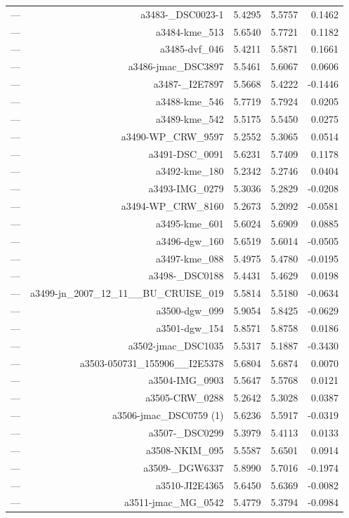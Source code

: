 \begin{table}[htbp]
\begin{tabular}{lrrrr}
— & a3483-_DSC0023-1 & 5.4295 & 5.5757 & 0.1462 \\
— & a3484-kme_513 & 5.6540 & 5.7721 & 0.1182 \\
— & a3485-dvf_046 & 5.4211 & 5.5871 & 0.1661 \\
— & a3486-jmac_DSC3897 & 5.5461 & 5.6067 & 0.0606 \\
— & a3487-_I2E7897 & 5.5668 & 5.4222 & -0.1446 \\
— & a3488-kme_546 & 5.7719 & 5.7924 & 0.0205 \\
— & a3489-kme_542 & 5.5175 & 5.5450 & 0.0275 \\
— & a3490-WP_CRW_9597 & 5.2552 & 5.3065 & 0.0514 \\
— & a3491-DSC_0091 & 5.6231 & 5.7409 & 0.1178 \\
— & a3492-kme_180 & 5.2342 & 5.2746 & 0.0404 \\
— & a3493-IMG_0279 & 5.3036 & 5.2829 & -0.0208 \\
— & a3494-WP_CRW_8160 & 5.2673 & 5.2092 & -0.0581 \\
— & a3495-kme_601 & 5.6024 & 5.6909 & 0.0885 \\
— & a3496-dgw_160 & 5.6519 & 5.6014 & -0.0505 \\
— & a3497-kme_088 & 5.4975 & 5.4780 & -0.0195 \\
— & a3498-_DSC0188 & 5.4431 & 5.4629 & 0.0198 \\
— & a3499-jn_2007_12_11__BU_CRUISE_019 & 5.5814 & 5.5180 & -0.0634 \\
— & a3500-dgw_099 & 5.9054 & 5.8425 & -0.0629 \\
— & a3501-dgw_154 & 5.8571 & 5.8758 & 0.0186 \\
— & a3502-jmac_DSC1035 & 5.5317 & 5.1887 & -0.3430 \\
— & a3503-050731_155906__I2E5378 & 5.6804 & 5.6874 & 0.0070 \\
— & a3504-IMG_0903 & 5.5647 & 5.5768 & 0.0121 \\
— & a3505-CRW_0288 & 5.2642 & 5.3028 & 0.0387 \\
— & a3506-jmac_DSC0759 (1) & 5.6236 & 5.5917 & -0.0319 \\
— & a3507-_DSC0299 & 5.3979 & 5.4113 & 0.0133 \\
— & a3508-NKIM_095 & 5.5587 & 5.6501 & 0.0914 \\
— & a3509-_DGW6337 & 5.8990 & 5.7016 & -0.1974 \\
— & a3510-JI2E4365 & 5.6450 & 5.6369 & -0.0082 \\
— & a3511-jmac_MG_0542 & 5.4779 & 5.3794 & -0.0984 \\

\end{tabular}
\end{table}
